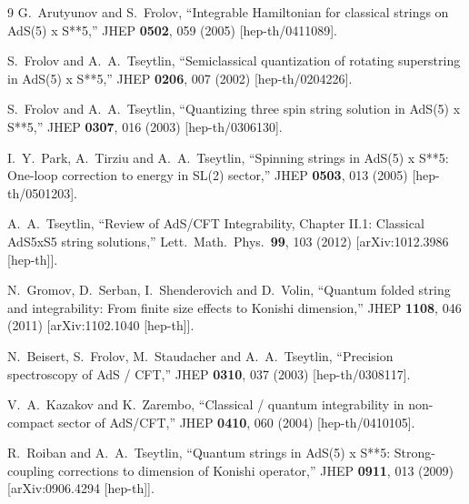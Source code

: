 \documentclass[a4paper,11pt]{article}
\numberwithin{equation}{section}
\begin{document}
\begin{thebibliography} {9}
  G.~Arutyunov and S.~Frolov,
  ``Integrable Hamiltonian for classical strings on AdS(5) x S**5,''
  JHEP {\bf 0502}, 059 (2005)
  [hep-th/0411089].

  S.~Frolov and A.~A.~Tseytlin,
  ``Semiclassical quantization of rotating superstring in AdS(5) x S**5,''
  JHEP {\bf 0206}, 007 (2002)
  [hep-th/0204226].

  S.~Frolov and A.~A.~Tseytlin,
  ``Quantizing three spin string solution in AdS(5) x S**5,''
  JHEP {\bf 0307}, 016 (2003)
  [hep-th/0306130].

  I.~Y.~Park, A.~Tirziu and A.~A.~Tseytlin,
  ``Spinning strings in AdS(5) x S**5: One-loop correction to energy in SL(2) sector,''
  JHEP {\bf 0503}, 013 (2005)
  [hep-th/0501203].

  A.~A.~Tseytlin,
  ``Review of AdS/CFT Integrability, Chapter II.1: Classical AdS5xS5 string solutions,''
  Lett.\ Math.\ Phys.\  {\bf 99}, 103 (2012)
  [arXiv:1012.3986 [hep-th]].

  N.~Gromov, D.~Serban, I.~Shenderovich and D.~Volin,
  ``Quantum folded string and integrability: From finite size effects to Konishi dimension,''
  JHEP {\bf 1108}, 046 (2011)
  [arXiv:1102.1040 [hep-th]].

  N.~Beisert, S.~Frolov, M.~Staudacher and A.~A.~Tseytlin,
  ``Precision spectroscopy of AdS / CFT,''
  JHEP {\bf 0310}, 037 (2003)
  [hep-th/0308117].

  V.~A.~Kazakov and K.~Zarembo,
  ``Classical / quantum integrability in non-compact sector of AdS/CFT,''
  JHEP {\bf 0410}, 060 (2004)
  [hep-th/0410105].

  R.~Roiban and A.~A.~Tseytlin,
  ``Quantum strings in AdS(5) x S**5: Strong-coupling corrections to dimension of Konishi operator,''
  JHEP {\bf 0911}, 013 (2009)
  [arXiv:0906.4294 [hep-th]].


\end{thebibliography}
\end{document}
